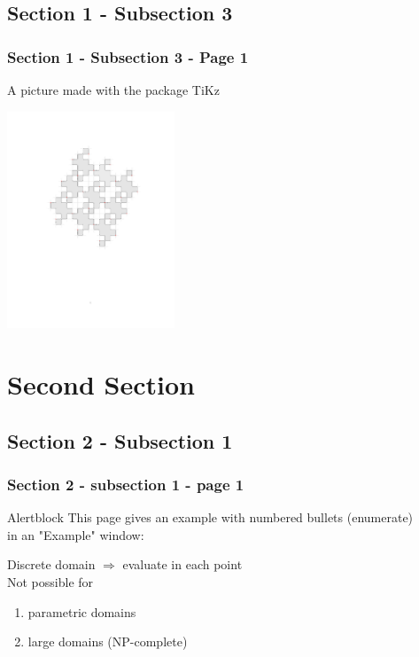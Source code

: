 \subsection{Section 1 - Subsection 3}

\begin{frame}\frametitle{Section 1 - Subsection 3 - Page 1}
	A picture made with the package TiKz\\
	\begin{example}
		\centering
		\includegraphics[width=5cm]{images/abadab-anti-theta-01.pdf}
	\end{example}
\end{frame}

\section{Second Section}

\subsection{Section 2 - Subsection 1}

\begin{frame}\frametitle{Section 2 - subsection 1 - page 1}
	\begin{alertblock}{Alertblock}
		This page gives an example with numbered bullets (enumerate)\\
		in an "Example" window:\\
	\end{alertblock}
	
	\begin{example}
		Discrete domain $\Rightarrow$ evaluate in each point\\
		Not possible for\\
		\begin{enumerate}
			\item <1-> parametric domains
			\item <2-> large domains (NP-complete)
		\end{enumerate}
	\end{example}
\end{frame}

